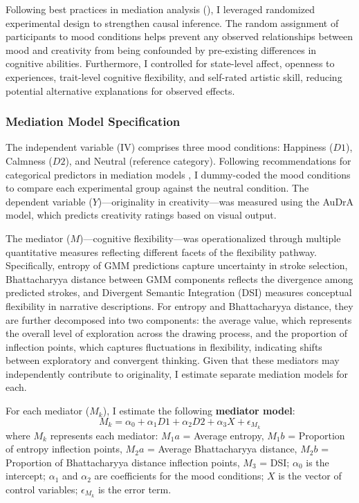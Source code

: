 \documentclass[../MA_Thesis.tex]{subfiles}
\begin{document}
Following best practices in mediation analysis (\cite{homburg_mediation_2022}), I leveraged randomized experimental design to strengthen causal inference. The random assignment of participants to mood conditions helps prevent any observed relationships between mood and creativity from being confounded by pre-existing differences in cognitive abilities. Furthermore, I controlled for state-level affect, openness to experiences, trait-level cognitive flexibility, and self-rated artistic skill, reducing potential alternative explanations for observed effects.

\subsubsection*{Mediation Model Specification}
The independent variable (IV) comprises three mood conditions: Happiness (\(D1\)), Calmness (\(D2\)), and Neutral (reference category). Following recommendations for categorical predictors in mediation models \cite{hayes_statistical_2014}, I dummy-coded the mood conditions to compare each experimental group against the neutral condition. The dependent variable (\(Y\))—originality in creativity—was measured using the AuDrA model, which predicts creativity ratings based on visual output.

The mediator (\(M\))—cognitive flexibility—was operationalized through multiple quantitative measures reflecting different facets of the flexibility pathway. Specifically, entropy of GMM predictions capture uncertainty in stroke selection, Bhattacharyya distance between GMM components reflects the divergence among predicted strokes, and Divergent Semantic Integration (DSI) measures conceptual flexibility in narrative descriptions. For entropy and Bhattacharyya distance, they are further decomposed into two components: the average value, which represents the overall level of exploration across the drawing process, and the proportion of inflection points, which captures fluctuations in flexibility, indicating shifts between exploratory and convergent thinking. Given that these mediators may independently contribute to originality, I estimate separate mediation models for each.

For each mediator (\(M_k\)), I estimate the following \textbf{mediator model}:
\begin{equation*}
    M_k = \alpha_0 + \alpha_1 D1 + \alpha_2 D2 + \alpha_3 X + \epsilon_{M_k}
\end{equation*}
where \( M_k \) represents each mediator: \( M_1a \) = Average entropy, \( M_1b \) = Proportion of entropy inflection points, \( M_2a \) = Average Bhattacharyya distance, \( M_2b \) = Proportion of Bhattacharyya distance inflection points, \( M_3 \) = DSI; \( \alpha_0 \) is the intercept; \( \alpha_1 \) and \( \alpha_2 \) are coefficients for the mood conditions; \( X \) is the vector of control variables; \( \epsilon_{M_k} \) is the error term.
\end{document}
